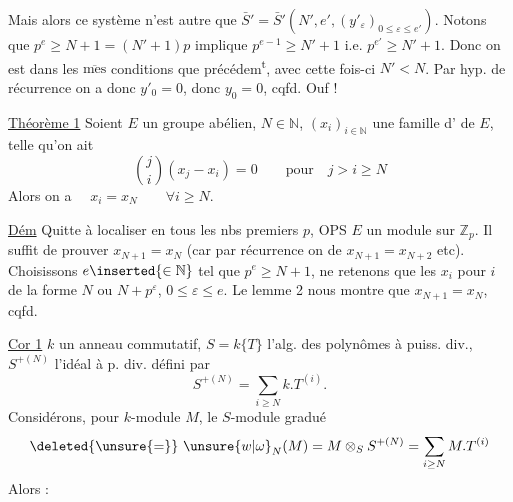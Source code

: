 Mais alors ce système n'est autre que $\bar S'=\bar S'(N',e',(y'_\varepsilon)_{0\leq\varepsilon\leq e'})$. Notons que $p^e\geq N+1=(N'+1)p$ implique $p^{e-1}\geq N'+1$ i.e. $p^{e'}\geq N'+1$. Donc on est dans les $\overline{\mathrm{mes}}$ conditions que précédem\textsuperscript{t}, avec cette fois-ci $N'<N$. Par hyp. de récurrence on a donc $y'_0=0$, donc $y_0=0$, cqfd. Ouf !

\uline{Théorème 1} Soient $E$ un groupe abélien, $N\in\mathbb{N}$, $(x_i)_{i\in\mathbb{N}}$ une famille d' de $E$, telle qu'on ait
\[
\binom{j}{i}(x_j-x_i)=0\qquad\text{pour}\quad j>i\geq N
\]
Alors on a $\quad x_i=x_N\qquad\forall i\geq N$.

\uline{Dém} Quitte à localiser en tous les nbs premiers $p$, OPS $E$ un module sur  $\mathbb{Z}_p$. Il suffit de prouver $x_{N+1}=x_N$ (car par récurrence on  de  $x_{N+1}=x_{N+2}$ etc). Choisissons $e\inserted{\in\mathbb{N}}$ tel que $p^e\geq N+1$, ne retenons que les $x_i$ pour $i$ de la forme $N$ ou $N+p^\varepsilon$, $0\leq\varepsilon\leq e$. Le lemme 2 nous montre que $x_{N+1}=x_N$, cqfd.

\uline{Cor 1}  $k$ un anneau commutatif, $S=k\{T\}$ l'alg. des polynômes à puiss. div.,   $S^{+(N)}$ l'idéal à p. div.  défini par
\[
S^{+(N)}=\sum_{i\geq N}k.T^{(i)}.
\]
 Considérons, pour   $k$-module $M$, le $S$-module gradué
\[
\deleted{\unsure{=}}\ \unsure{w|\omega}_N(M)=M\otimes_S S^{+(N)}=\sum_{i\geq N}M.T^{(i)}
\]
Alors :

